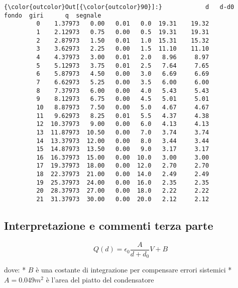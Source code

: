 \documentclass[11pt]{article}
\begin{document}
\begin{Verbatim}[commandchars=\\\{\}]
{\color{outcolor}Out[{\color{outcolor}90}]:}            d   d-d0  fondo  giri      q  segnale
         0    1.37973   0.00   0.01   0.0  19.31    19.32
         1    2.12973   0.75   0.00   0.5  19.31    19.31
         2    2.87973   1.50   0.01   1.0  15.31    15.32
         3    3.62973   2.25   0.00   1.5  11.10    11.10
         4    4.37973   3.00   0.01   2.0   8.96     8.97
         5    5.12973   3.75   0.01   2.5   7.64     7.65
         6    5.87973   4.50   0.00   3.0   6.69     6.69
         7    6.62973   5.25   0.00   3.5   6.00     6.00
         8    7.37973   6.00   0.00   4.0   5.43     5.43
         9    8.12973   6.75   0.00   4.5   5.01     5.01
         10   8.87973   7.50   0.00   5.0   4.67     4.67
         11   9.62973   8.25   0.01   5.5   4.37     4.38
         12  10.37973   9.00   0.00   6.0   4.13     4.13
         13  11.87973  10.50   0.00   7.0   3.74     3.74
         14  13.37973  12.00   0.00   8.0   3.44     3.44
         15  14.87973  13.50   0.00   9.0   3.17     3.17
         16  16.37973  15.00   0.00  10.0   3.00     3.00
         17  19.37973  18.00   0.00  12.0   2.70     2.70
         18  22.37973  21.00   0.00  14.0   2.49     2.49
         19  25.37973  24.00   0.00  16.0   2.35     2.35
         20  28.37973  27.00   0.00  18.0   2.22     2.22
         21  31.37973  30.00   0.00  20.0   2.12     2.12
\end{Verbatim}
            
    \subsection{Interpretazione e commenti terza
parte}\label{interpretazione-e-commenti-terza-parte}

\[ Q(d) = \epsilon_0 \frac{ A}{ d+d_0} V + B \]

dove: * \(B\) è una costante di integrazione per compensare errori
sistemici * \(A = 0.049 m^2\) è l'area del piatto del condensatore
\end{document}

